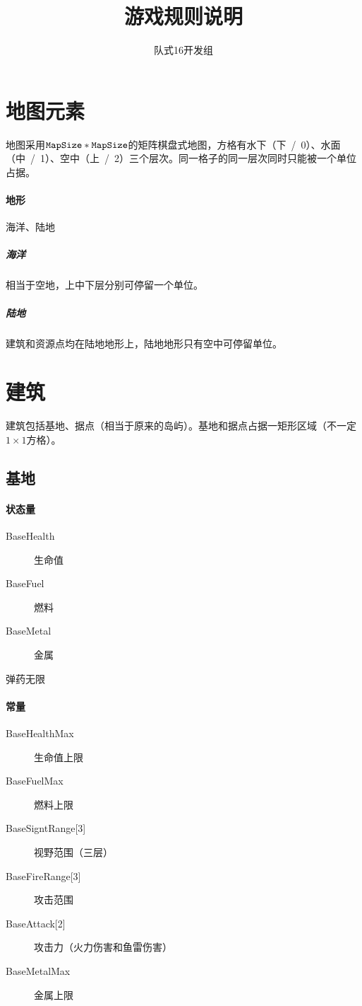 \documentclass[11pt,a4paper]{article}
\begin{document}
  \title{游戏规则说明}
  \author{队式16开发组}
  \maketitle

  \section{地图元素}
    地图采用$\text{\ttfamily MapSize} * \text{\ttfamily MapSize}$的矩阵棋盘式地图，方格有水下（下~/~0）、水面（中~/~1）、空中（上~/~2）三个层次。同一格子的同一层次同时只能被一个单位占据。

    \paragraph{地形} 海洋、陆地
      \subparagraph{海洋} 相当于空地，上中下层分别可停留一个单位。
      \subparagraph{陆地} 建筑和资源点均在陆地地形上，陆地地形只有空中可停留单位。


  \section{建筑}
    建筑包括基地、据点（相当于原来的岛屿）。基地和据点占据一矩形区域（不一定$1×1$方格）。

    \subsection{基地}
      \paragraph{状态量}
        \begin{minipage}[t]{0.8\textwidth}
          \begin{description}
            \item[BaseHealth] 生命值
            \item[BaseFuel] 燃料
            \item[BaseMetal] 金属
          \end{description}
          弹药无限
        \end{minipage}

      \paragraph{常量}
        \begin{minipage}[t]{0.8\textwidth}
          \begin{description}
            \item[BaseHealthMax] 生命值上限
            \item[BaseFuelMax] 燃料上限
            \item[{BaseSigntRange[3]}] 视野范围（三层）
            \item[{BaseFireRange[3]}] 攻击范围
            \item[{BaseAttack[2]}] 攻击力（火力伤害和鱼雷伤害）
            \item[BaseMetalMax] 金属上限
          \end{description}
        \end{minipage}
\end{document}
